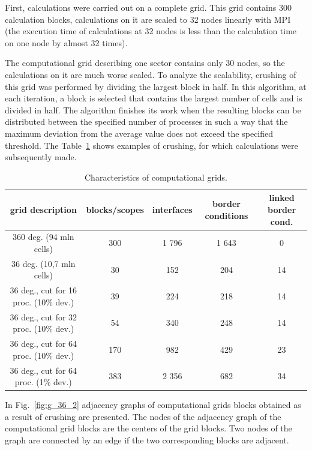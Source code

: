 \documentclass[
11pt,%
tightenlines,%
twoside,%
onecolumn,%
nofloats,%
nobibnotes,%
nofootinbib,%
superscriptaddress,%
noshowpacs,%
centertags]%
{revtex4}
\begin{document}
First, calculations were carried out on a complete grid.
This grid contains 300 calculation blocks, calculations on it are scaled to 32 nodes linearly with MPI \cite{Queen} (the execution time of calculations at 32 nodes is less than the calculation time on one node by almost 32 times).

The computational grid describing one sector contains only 30 nodes, so the calculations on it are much worse scaled.
To analyze the scalability, crushing of this grid was performed by dividing the largest block in half.
In this algorithm, at each iteration, a block is selected that contains the largest number of cells and is divided in half.
The algorithm finishes its work when the resulting blocks can be distributed between the specified number of processes in such a way that the maximum deviation from the average value does not exceed the specified threshold.
The Table~\ref{tab:grids} shows examples of crushing, for which calculations were subsequently made.

\begin{table}[!h]
\setcaptionmargin{0mm}
\onelinecaptionsfalse
{}
\caption{Characteristics of computational grids.}
\bigskip
\begin{tabular}{|c|c|c|c|c|}
\hline
grid description & blocks/scopes & interfaces & border conditions & linked border cond. \\
\hline
360 deg. (94 mln cells) & 300 & 1 796 & 1 643 & 0 \\
36 deg. (10,7 mln cells) & 30 & 152 & 204 & 14 \\
\hline
36 deg., cut for 16 proc. (10\% dev.) & 39 & 224 & 218 & 14 \\
36 deg., cut for 32 proc. (10\% dev.) & 54 & 340 & 248 & 14 \\
36 deg., cut for 64 proc. (10\% dev.) & 170 & 982 & 429 & 23 \\
\hline
36 deg., cut for 64 proc. (1\% dev.) & 383 & 2 356 & 682 & 34 \\
\hline
\end{tabular}
\label{tab:grids}
\end{table}

In Fig.~\ref{fig:g_36_2} adjacency graphs of computational grids blocks obtained as a result of crushing are presented.
The nodes of the adjacency graph of the computational grid blocks are the centers of the grid blocks.
Two nodes of the graph are connected by an edge if the two corresponding blocks are adjacent.
\end{document}
